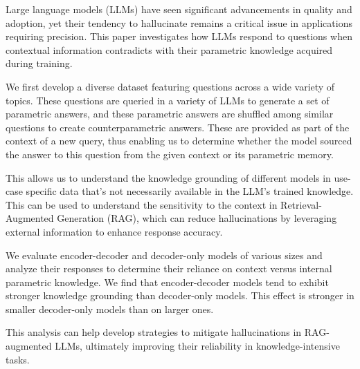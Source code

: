 Large language models (LLMs) have seen significant advancements in quality and adoption, yet their tendency to hallucinate remains a critical issue in applications requiring precision.
This paper investigates how LLMs respond to questions when contextual information contradicts with their parametric knowledge acquired during training.

We first develop a diverse dataset featuring questions across a wide variety of topics.
These questions are queried in a variety of LLMs to generate a set of parametric answers, and these parametric answers are shuffled among similar questions to create counterparametric answers.
These are provided as part of the context of a new query, thus enabling us to determine whether the model sourced the answer to this question from the given context or its parametric memory.

This allows us to understand the knowledge grounding of different models in use-case specific data that's not necessarily available in the LLM's trained knowledge.
This can be used to understand the sensitivity to the context in Retrieval-Augmented Generation (RAG), which can reduce hallucinations by leveraging external information to enhance response accuracy.

We evaluate encoder-decoder and decoder-only models of various sizes and analyze their responses to determine their reliance on context versus internal parametric knowledge.
We find that encoder-decoder models tend to exhibit stronger knowledge grounding than decoder-only models.
This effect is %
stronger in smaller decoder-only models than on larger ones.

This analysis can help develop strategies to mitigate hallucinations in RAG-augmented LLMs, ultimately improving their reliability in knowledge-intensive tasks.
